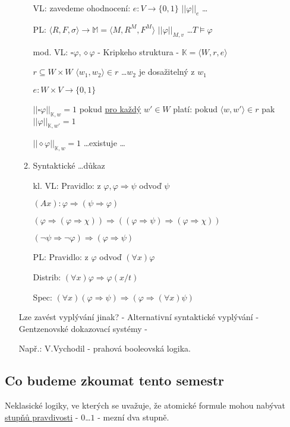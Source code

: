 \documentclass[10pt, a4paper, titlepage]{article}
\theoremstyle{note}
\begin{document}
\begin{enumerate}
\begin{enumerate}
    VL: zavedeme ohodnocení: $e: V\rightarrow\{0,1\}$ $||\varphi||_{e}$ \dots

    PL: $\langle R, F, \sigma\rangle \rightarrow \mathbb{M}=\langle M, R^{M}, F^{M}\rangle$ $||\varphi||_{M,v}$ \dots $T \models \varphi$

    mod. VL: $\square\varphi , \diamond\varphi$ - Kripkeho struktura - $\mathbb{K} = \langle W, r, e\rangle$ 

  $r\subseteq W \times W$ $\langle w_{1},w_{2}\rangle \in r$ \dots $w_{2}$ je dosažitelný z $w_{1}$ 

$e: W \times V \rightarrow \{0,1\}$

$||\square\varphi||_{\mathbb{K},w} = 1$ pokud \underline{pro každý} $w'\in W$ platí: pokud $\langle w, w'\rangle\in r$ pak $||\varphi||_{\mathbb{K},w'}=1$

$||\diamond\varphi||_{\mathbb{K},w} = 1$ \dots existuje \dots

  \item Syntaktické \dots důkaz

  kl. VL: Pravidlo: z $\varphi, \varphi\Rightarrow\psi$ odvoď $\psi$

    $(Ax): \varphi\Rightarrow(\psi\Rightarrow\varphi)$

    $(\varphi\Rightarrow(\varphi\Rightarrow\chi))\Rightarrow((\varphi\Rightarrow\psi)\Rightarrow(\varphi\Rightarrow\chi))$

    $(\neg\psi\Rightarrow\neg\varphi)\Rightarrow(\varphi\Rightarrow\psi)$

    PL: Pravidlo: z $\varphi$ odvoď $(\forall x)\varphi$

    Distrib: $(\forall x)\varphi\Rightarrow\varphi(x/t)$

    Spec: $(\forall x)(\varphi\Rightarrow\psi)\Rightarrow(\varphi\Rightarrow(\forall x) \psi)$

  \end{enumerate}

  Lze zavést vyplývání jinak? - Alternativní syntaktické vyplývání - Gentzenovské dokazovací systémy - 

  Např.: V.Vychodil - prahová booleovská logika.
\end{enumerate}

\subsection{Co budeme zkoumat tento semestr}
Neklasické logiky, ve kterých se uvažuje, že atomické formule mohou nabývat \underline{stupňů pravdivosti} - $0$\dots$1$ - mezní dva stupně.
\end{document}
